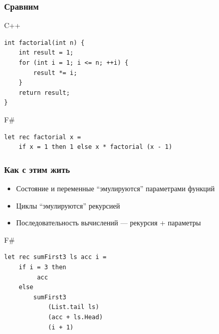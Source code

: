 \documentclass{../../slides-style}
\begin{document}
    \begin{frame}[fragile]
        \frametitle{Сравним}
        \begin{alertblock}{C++}
            \begin{verbatim}
int factorial(int n) {
    int result = 1;
    for (int i = 1; i <= n; ++i) {
        result *= i;
    }
    return result;
}
            \end{verbatim}
        \end{alertblock}
        \begin{exampleblock}{F\#}
            \begin{verbatim}
let rec factorial x =
    if x = 1 then 1 else x * factorial (x - 1)
            \end{verbatim}
        \end{exampleblock}
    \end{frame}

    \begin{frame}[fragile]
        \frametitle{Как с этим жить}
        \begin{itemize}
            \item Состояние и переменные \enquote{эмулируются} параметрами функций
            \item Циклы \enquote{эмулируются} рекурсией
            \item Последовательность вычислений --- рекурсия + параметры
        \end{itemize}
        \begin{exampleblock}{F\#}
            \begin{verbatim}
let rec sumFirst3 ls acc i =
    if i = 3 then 
         acc 
    else 
        sumFirst3 
            (List.tail ls) 
            (acc + ls.Head) 
            (i + 1)
            \end{verbatim}
        \end{exampleblock}
    \end{frame}
\end{document}
